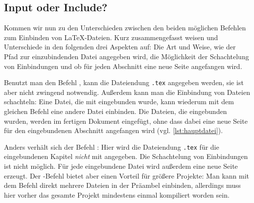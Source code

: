 \subsection{Input oder Include?}
\label{subsec:input-vs-include}
Kommen wir nun zu den Unterschieden zwischen den beiden möglichen Befehlen zum Einbinden von \LaTeX-Dateien. Kurz zusammengefasst weisen \texttt{} und \texttt{} Unterschiede in den folgenden drei Aspekten auf: Die Art und Weise, wie der Pfad zur einzubindenden Datei angegeben wird, die Möglichkeit der Schachtelung von Einbindungen und ob für jeden Abschnitt eine neue Seite angefangen wird.
 
Benutzt man den Befehl \texttt{}, kann die Dateiendung \texttt{.tex} angegeben werden, sie ist aber nicht zwingend notwendig. Außerdem kann man die Einbindung von Dateien schachteln: Eine Datei, die mit \texttt{} eingebunden wurde, kann wiederum mit dem gleichen Befehl eine andere Datei einbinden. Die Dateien, die eingebunden wurden, werden im fertigen Dokument eingefügt, ohne dass dabei eine neue Seite für den eingebundenen Abschnitt angefangen wird (vgl. \cref{lst:hauptdatei}).
 
Anders verhält sich der Befehl \texttt{}: Hier wird die Dateiendung \texttt{.tex} für die eingebundenen Kapitel \emph{nicht} mit angegeben. Die Schachtelung von Einbindungen ist nicht möglich. Für jede eingebundene Datei wird außerdem eine neue Seite erzeugt. Der \texttt{}-Befehl bietet aber einen Vorteil für größere Projekte: Man kann mit dem Befehl \texttt{} direkt mehrere Dateien in der Präambel einbinden, allerdings muss hier vorher das gesamte Projekt mindestens einmal kompiliert worden sein. 

